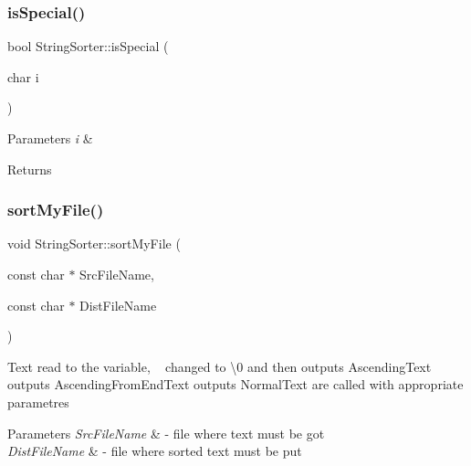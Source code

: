 \subsubsection{\texorpdfstring{is\+Special()}{isSpecial()}}
{\footnotesize\ttfamily bool String\+Sorter\+::is\+Special (\begin{DoxyParamCaption}\item[{char}]{i }\end{DoxyParamCaption})}


\begin{DoxyParams}{Parameters}
{\em i} & \\
\hline
\end{DoxyParams}
\begin{DoxyReturn}{Returns}

\end{DoxyReturn}
\mbox{\label{namespaceStringSorter_a16b92b697d5f8640ad8ba629d0b1afc3}} 
\subsubsection{\texorpdfstring{sort\+My\+File()}{sortMyFile()}}
{\footnotesize\ttfamily void String\+Sorter\+::sort\+My\+File (\begin{DoxyParamCaption}\item[{const char $\ast$}]{Src\+File\+Name,  }\item[{const char $\ast$}]{Dist\+File\+Name }\end{DoxyParamCaption})}

Text read to the variable, ~\newline
 changed to \textbackslash{}0 and then outputs Ascending\+Text outputs Ascending\+From\+End\+Text outputs Normal\+Text are called with appropriate parametres 
\begin{DoxyParams}{Parameters}
{\em Src\+File\+Name} & -\/ file where text must be got \\
\hline
{\em Dist\+File\+Name} & -\/ file where sorted text must be put \\
\hline
\end{DoxyParams}
